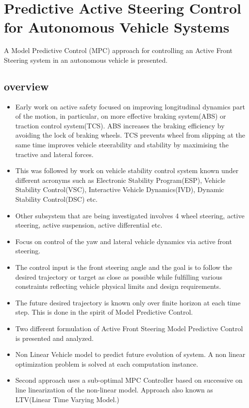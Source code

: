 \section{Predictive Active Steering Control for Autonomous Vehicle Systems}
A Model Predictive Control (MPC)
approach for controlling an Active Front Steering system in an
autonomous vehicle is presented.
\subsection{overview}
\begin{itemize}
	\item Early work on active safety focused on improving longitudinal dynamics part of the motion, in particular, on more effective braking system(ABS) or traction control system(TCS). ABS increases the braking efficiency by avoiding the lock of braking wheels. TCS prevents wheel from slipping at the same time improves vehicle steerability and stability by maximising the tractive and lateral forces.
	\item This was followed by work on vehicle stability control system known under different acronyms such as Electronic Stability Program(ESP), Vehicle Stability Control(VSC), Interactive Vehicle Dynamics(IVD), Dynamic Stability Control(DSC) etc.
	\item Other subsystem that are being investigated involves 4 wheel steering, active steering, active suspension, active differential etc.
	\item Focus on control of the yaw and lateral vehicle dynamics via active front steering.
	\item The control input is the front steering angle and the goal is to follow the desired trajectory or target as close as possible while fulfilling
	various constraints reflecting vehicle physical limits and design
	requirements.
	\item The future desired trajectory is known only over
	finite horizon at each time step. This is done in the spirit of
	Model Predictive Control.
	\item Two different formulation of Active Front Steering Model Predictive Control is presented and analyzed.
	\item Non Linear Vehicle model to predict future evolution of system. A non linear optimization problem is solved at each computation instance.
	\item Second approach uses a sub-optimal MPC Controller based on successive on line linearization of the non-linear model. Approach also known as LTV(Linear Time Varying Model.)
\end{itemize}
